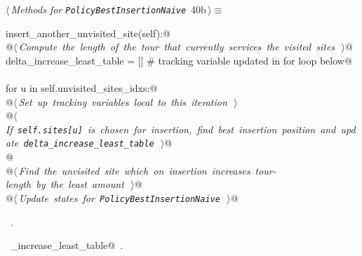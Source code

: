 \documentclass[11.5pt]{report}
\begin{document}
\vspace{-0.8cm}\newchunk 
\begin{flushleft} \small\label{scrap55}\raggedright\small
{} $\langle\,${\itshape Methods for \verb|PolicyBestInsertionNaive|}\nobreak\ {\footnotesize {40b}}$\,\rangle\equiv$
\vspace{-1ex}
\begin{list}{}{} \item
\mbox{}\verb@def insert_another_unvisited_site(self):@\\
\mbox{}\verb@   @\hbox{$\langle\,${\itshape Compute the length of the tour that currently services the visited sites}\nobreak\ {\footnotesize {}}$\,\rangle$}\verb@    @\\
\mbox{}\verb@   delta_increase_least_table = [] # tracking variable updated in for loop below@\\
\mbox{}\verb@@\\
\mbox{}\verb@   for u in self.unvisited_sites_idxs:@\\
\mbox{}\verb@      @\hbox{$\langle\,${\itshape Set up tracking variables local to this iteration}\nobreak\ {\footnotesize {}}$\,\rangle$}\verb@@\\
\mbox{}\verb@      @\hbox{$\langle\,${\itshape If \texttt{self.sites[u]} is chosen for insertion, find best insertion position and update \texttt{delta\_increase\_least\_table}}\nobreak\ {\footnotesize {}}$\,\rangle$}\verb@  @\\
\mbox{}\verb@                 @\\
\mbox{}\verb@   @\hbox{$\langle\,${\itshape Find the unvisited site which on insertion increases tour-length by the least amount}\nobreak\ {\footnotesize {}}$\,\rangle$}\verb@     @\\
\mbox{}\verb@   @\hbox{$\langle\,${\itshape Update states for \texttt{PolicyBestInsertionNaive}}\nobreak\ {\footnotesize {}}$\,\rangle$}\verb@ @\\
\mbox{}\verb@@{\NWsep}
\end{list}
\vspace{-1.5ex}
\footnotesize
\begin{list}{}{\setlength{\itemsep}{-\parsep}\setlength{\itemindent}{-\leftmargin}}
\item \NWtxtMacroRefIn\ .
\item \NWtxtIdentsDefed\nobreak\  \verb@delta_increase_least_table@\nobreak\ .
\item{}
\end{list}
\vspace{4ex}
\end{flushleft}
\end{document}
